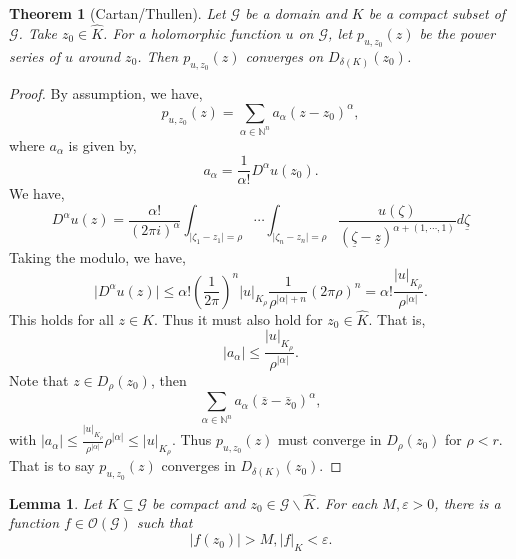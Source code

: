 \documentclass{article}
\newtheorem{theorem}{Theorem} [section]
\newtheorem{lemma}{Lemma}[section]
\newcommand{\N}[0]{\mathbb{N}}
\newcommand{\G}[0]{\mathcal{G}}
\newcommand{\mzeta}[0]{\underline{\zeta}}
\newcommand{\mz}[0]{\underline{z}}
\newcommand{\cz}[0]{\overline{z}}
\newcommand{\Ouv}[0]{\mathcal{O}}
\begin{document}
\begin{theorem}[Cartan/Thullen]
  \label{theorem_cartan_thullen}
  Let $\G$ be a domain and $K$ be a compact subset of $\G$. Take $z_0\in\hat{K}$. For a holomorphic function $u$ on $\G$, let
   $p_{u,z_0}(z) $ be the power series of $u$ around $z_0$. Then $p_{u,z_0}(z)$ converges on $D_{\delta(K)}(z_0)$.
\end{theorem}

\begin{proof}
  By assumption, we have,
  \begin{equation*}
    p_{u,z_0}(z) = \sum_{\alpha\in\N^n}a_{\alpha}(z-z_0)^\alpha,
  \end{equation*}
  where $a_\alpha$ is given by,
  \begin{equation*}
    a_\alpha = {\frac 1 {\alpha!}}D^\alpha u(z_0).
  \end{equation*}
  We have,
  \begin{equation*}
    D^\alpha u(z) = {\frac {\alpha!} {(2\pi i)^\alpha}}\int_{\vert \zeta_1-z_1\vert =\rho}\cdots\int_{\vert \zeta_n-z_n\vert =\rho}{\frac {u(\zeta)} {(\mzeta-\mz)^{\alpha+(1,\cdots,1)}}}d\mzeta
  \end{equation*}
  Taking the modulo, we have,
  \begin{equation*}
    \vert D^\alpha u(z)\vert \leq \alpha!\left({\frac 1 {2\pi}}\right)^n\vert u\vert_{K_\rho}{\frac 1 {\rho^{\vert\alpha\vert+n}}}(2\pi\rho)^n = \alpha!{\frac {\vert u\vert_{K_\rho}} {\rho^{\vert\alpha\vert}}}.
  \end{equation*}
  This holds for all $z\in K$. Thus it must also hold for $z_0\in \hat{K}$. That is,
  \begin{equation*}
    \vert a_\alpha\vert \leq {\frac {\vert u\vert_{K_\rho}} {\rho^{\vert \alpha\vert}}}.
  \end{equation*}
  Note that $z\in D_\rho(z_0)$, then 
  \begin{equation*}
    \sum_{\alpha\in\N^n}a_\alpha(\cz-\cz_0)^\alpha,
  \end{equation*}
  with $\vert a_\alpha\vert\leq {\frac {\vert u\vert_{K_\rho}} {\rho^{\vert\alpha\vert}}}\rho^{\vert\alpha\vert}\leq \vert u\vert_{K_\rho}$. Thus $p_{u,z_0}(z)$ must converge in $D_\rho(z_0)$ for $\rho<r$. 
  That is to say $p_{u,z_0}(z)$ converges in $D_{\delta(K)}(z_0)$.
\end{proof}

\begin{lemma}
  Let $K\subseteq\G$ be compact and $z_0\in\G\backslash\hat{K}$. For each $M,\varepsilon>0$, there is a function $f\in\Ouv(\G)$ such that 
  \begin{equation*}
    \vert f(z_0)\vert >M,\vert f\vert_K<\varepsilon.
  \end{equation*}
\end{lemma}
\end{document}
